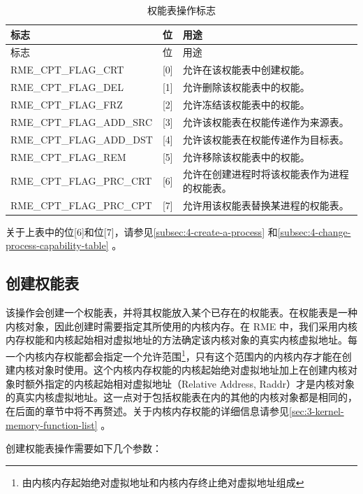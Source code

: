 \begin{xltabular}{\textwidth}{@{}>{\hsize\raggedright\arraybackslash}X>{\hsize\raggedright\arraybackslash}X>{\hsize\raggedright\arraybackslash}X@{}}
\caption{权能表操作标志}\label{tab:2-4-capability-table-operation-flags}\\
\toprule
标志 & 位 & 用途\tabularnewline
\endfirsthead
\toprule
标志 & 位 & 用途\tabularnewline
\midrule
\endhead
\bottomrule
\endlastfoot
RME\_CPT\_FLAG\_CRT & {[}0{]} &
允许在该权能表中创建权能。\tabularnewline
RME\_CPT\_FLAG\_DEL & {[}1{]} &
允许删除该权能表中的权能。\tabularnewline
RME\_CPT\_FLAG\_FRZ & {[}2{]} &
允许冻结该权能表中的权能。\tabularnewline
RME\_CPT\_FLAG\_ADD\_SRC & {[}3{]} &
允许该权能表在权能传递作为来源表。\tabularnewline
RME\_CPT\_FLAG\_ADD\_DST & {[}4{]} &
允许该权能表在权能传递作为目标表。\tabularnewline
RME\_CPT\_FLAG\_REM & {[}5{]} &
允许移除该权能表中的权能。\tabularnewline
RME\_CPT\_FLAG\_PRC\_CRT & {[}6{]} &
允许在创建进程时将该权能表作为进程的权能表。\tabularnewline
RME\_CPT\_FLAG\_PRC\_CPT & {[}7{]} &
允许用该权能表替换某进程的权能表。\tabularnewline
\end{xltabular}

关于上表中的位{[}6{]}和位{[}7{]}，请参见\ref{subsec:4-create-a-process}
和\ref{subsec:4-change-process-capability-table}
。

\subsection{创建权能表}\label{subsec:2-create-a-capability-table}

该操作会创建一个权能表，并将其权能放入某个已存在的权能表。在权能表是一种内核对象，因此创建时需要指定其所使用的内核内存。在 RME 中，我们采用内核内存权能和内核起始相对虚拟地址的方法确定该内核对象的真实内核虚拟地址。每一个内核内存权能都会指定一个允许范围\footnote{由内核内存起始绝对虚拟地址和内核内存终止绝对虚拟地址组成}，只有这个范围内的内核内存才能在创建内核对象时使用。这个内核内存权能的内核起始绝对虚拟地址加上在创建内核对象时额外指定的内核起始相对虚拟地址（Relative
Address,
Raddr）才是内核对象的真实内核虚拟地址。这一点对于包括权能表在内的其他的内核对象都是相同的，在后面的章节中将不再赘述。关于内核内存权能的详细信息请参见\ref{sec:3-kernel-memory-function-list}
。

创建权能表操作需要如下几个参数：

